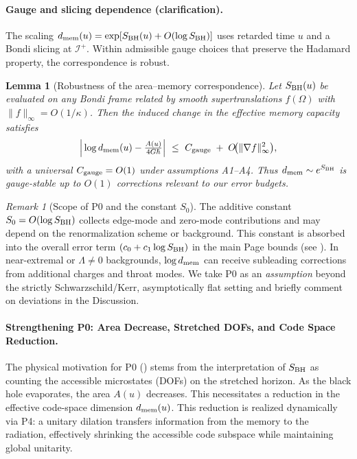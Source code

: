 \documentclass[a4paper,11pt]{article}
\theoremstyle{plain}
\newtheorem{lemma}{Lemma}
\theoremstyle{definition}
\theoremstyle{remark}
\newtheorem{remark}{Remark}
\begin{document}
\paragraph{Gauge and slicing dependence (clarification).}
The scaling \(d_{\rm mem}(u)=\exp[S_{\rm BH}(u)+O(\log S_{\rm BH})]\) uses retarded time \(u\) and a Bondi slicing at \(\mathcal{I}^+\).
Within admissible gauge choices that preserve the Hadamard property, the correspondence is robust.

\begin{lemma}[Robustness of the area--memory correspondence]\label{lem:gauge-robustness}
Let \(S_{\rm BH}(u)\) be evaluated on any Bondi frame related by smooth supertranslations \(f(\Omega)\) with \(\|f\|_\infty=O(1/\kappa)\).
Then the induced change in the effective memory capacity satisfies
\[
\Big|\log d_{\rm mem}(u)-\tfrac{A(u)}{4G\hbar}\Big|\ \le\ C_{\rm gauge}\;+\;O\!\big(\|\nabla f\|_\infty^2\big),
\]
with a universal \(C_{\rm gauge}=O(1)\) under assumptions A1--A4.
Thus \(d_{\rm mem}\sim e^{S_{\rm BH}}\) is gauge-stable up to \(O(1)\) corrections relevant to our error budgets.
\end{lemma}

\begin{remark}[Scope of P0 and the constant $S_0$]\label{rem:scope_P0}
The additive constant $S_0=O(\log S_{\rm BH})$ collects edge-mode and zero-mode contributions and may depend on the renormalization scheme or background. This constant is absorbed into the overall error term $(c_0 + c_1\log S_{\rm BH})$ in the main Page bounds (see ).
In near-extremal or $\Lambda\!\neq\!0$ backgrounds, $\log d_{\rm mem}$ can receive subleading corrections from additional charges and throat modes.
We take P0 as an \emph{assumption} beyond the strictly Schwarzschild/Kerr, asymptotically flat setting and briefly comment on deviations in the Discussion.
\end{remark}
\paragraph{Strengthening P0: Area Decrease, Stretched DOFs, and Code Space Reduction.}
The physical motivation for P0 () stems from the interpretation of $S_{\rm BH}$ as counting the accessible microstates (DOFs) on the stretched horizon. As the black hole evaporates, the area $A(u)$ decreases. This necessitates a reduction in the effective code-space dimension $d_{\rm mem}(u)$. This reduction is realized dynamically via P4: a unitary dilation transfers information from the memory to the radiation, effectively shrinking the accessible code subspace while maintaining global unitarity.
\end{document}

